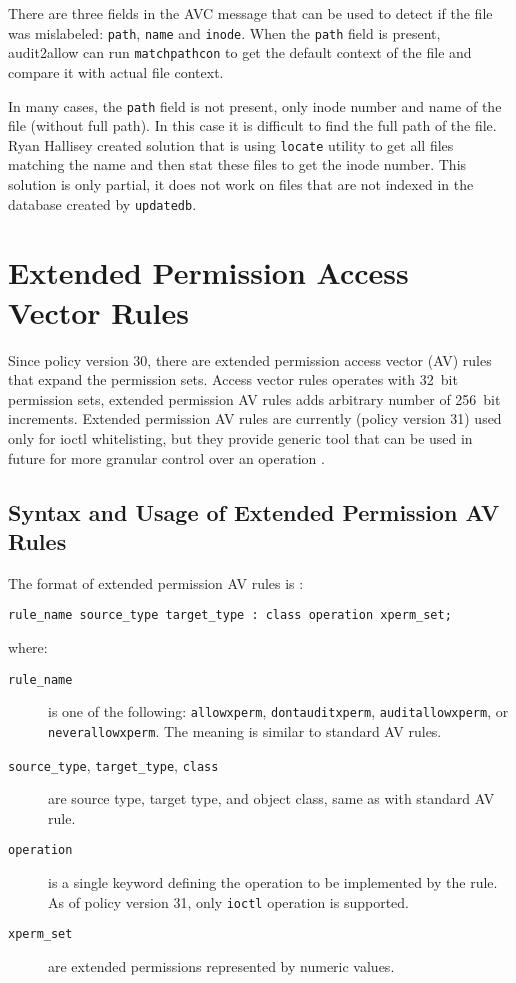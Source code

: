 There are three fields in the AVC message that can be used to detect if the file
was mislabeled: \texttt{path}, \texttt{name} and \texttt{inode}. When the
\texttt{path} field is present, audit2allow can run \texttt{matchpathcon} to get
the default context of the file and compare it with actual file context.

In many cases, the \texttt{path} field is not present, only inode number and
name of the file (without full path). In this case it is difficult to find the
full path of the file. Ryan Hallisey created solution \cite{restoreconpullreq}
that is using \texttt{locate} utility to get all files matching the name and
then stat these files to get the inode number. This solution is only partial, it
does not work on files that are not indexed in the database created by
\texttt{updatedb}.

\section{Extended Permission Access Vector Rules}
Since policy version 30, there are extended permission access vector (AV) rules
that expand the permission sets. Access vector rules operates with 32~bit
permission sets, extended permission AV rules adds arbitrary number of 256~bit
increments. Extended permission AV rules are currently (policy version 31) used
only for ioctl whitelisting, but they provide generic tool that can be used in
future for more granular control over an operation \cite{selinuxmailxperms}.

\subsection{Syntax and Usage of Extended Permission AV Rules}
The format of extended permission AV rules is \cite{xpermrules}:
\begin{lstlisting}
rule_name source_type target_type : class operation xperm_set;
\end{lstlisting}
where:
\begin{description}
    \item [\texttt{rule\_name}] is one of the following: \texttt{allowxperm},
        \texttt{dontauditxperm}, \texttt{auditallowxperm}, or
        \texttt{neverallowxperm}. The meaning is similar to standard AV rules.
    \item [\texttt{source\_type}, \texttt{target\_type}, \texttt{class}] are
        source type, target type, and object class, same as with standard AV
        rule.
    \item [\texttt{operation}] is a single keyword defining the operation to be
        implemented by the rule. As of policy version 31, only \texttt{ioctl}
        operation is supported.
    \item [\texttt{xperm\_set}] are extended permissions represented by numeric
        values.
\end{description}

